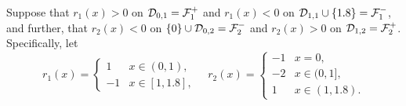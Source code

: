Suppose that \(r_1(x)>0\) on \(\mathcal{D}_{0,1}=\mathcal F_1^+\) and \(r_1(x)<0\) on \(\mathcal{D}_{1,1}\cup\{1.8\}=\mathcal F_1^-\), and further, that \(r_2(x)<0\) on \(\{0\}\cup\mathcal{D}_{0,2}=\mathcal F_2^-\) and \(r_2(x)>0\) on \(\mathcal{D}_{1,2}=\mathcal F_2^+\). Specifically, let 
\[r_1(x) = \begin{cases} 1 & x \in (0,1), \\ -1 & x \in [1,1.8],\end{cases}\quad r_2(x) = \begin{cases} -1 & x = 0, \\ -2 & x \in (0,1], \\ 1 & x \in (1,1.8). \end{cases}\]

